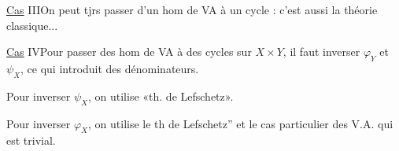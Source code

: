 \uline{Cas} III\quad On peut tjrs passer d'un hom de VA à un cycle : c'est aussi la théorie classique...

\uline{Cas} IV\quad Pour passer des hom de VA à des cycles sur $X\times Y$, il faut inverser $\varphi_Y$ et $\psi_X$, ce qui introduit des dénominateurs.

Pour inverser $\psi_X$, on utilise «th. de Lefschetz». 

Pour inverser $\varphi_X$, on utilise le \unsure{\textquoteleft|\textquotedblleft|\guillemotleft{}}th de Lefschetz'' et le cas particulier des V.A. qui est trivial.
